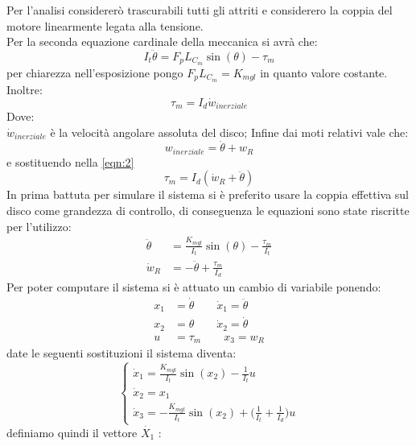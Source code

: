 \documentclass[12pt,a4paper,twoside, openright]{scrartcl}
\newcommand{\thetap}{\dot{\theta}}
\newcommand{\thetapp}{\ddot{\theta}}
\newcommand{\Xup}{\dot{X_1}}
\newcommand{\xu}{x_1}
\newcommand{\xd}{x_2}
\newcommand{\xt}{x_3}
\newcommand{\xup}{\dot{x}_1}
\newcommand{\xdp}{\dot{x}_2}
\newcommand{\xtp}{\dot{x}_3}
\begin{document}
	Per l'analisi considererò trascurabili tutti gli attriti e considerero la coppia del motore linearmente legata alla tensione.\\
	Per la seconda equazione cardinale della meccanica si avrà che:
	\begin{equation}
		\label{eqn:1}
		I_t\thetapp=F_p L_{C_m}\sin(\theta)- \tau_m
	\end{equation}
	per chiarezza nell'esposizione pongo $F_p L_{C_m}=K_{mgl}$ in quanto valore costante.
	Inoltre:
	\begin{equation}
		\label{eqn:2} 
	 	\tau_m =I_d \dot{w}_{inerziale}
	 \end{equation}
	Dove:\\
	 $\dot{w}_{inerziale}$ è la velocità angolare assoluta del disco;
	Infine dai moti relativi vale che:
	\begin{equation}
		\label{eqn:4}
		w_{inerziale}=\thetap+w_R 
	\end{equation}
	e sostituendo nella \ref{eqn:2}
	\begin{equation}
		\label{eqn:5}
		\tau_m =I_d (\dot{w}_{R}+\thetapp)
	\end {equation}
	In prima battuta per simulare il sistema si è preferito usare la coppia effettiva sul disco come grandezza di controllo, di conseguenza le equazioni sono state riscritte per l'utilizzo:
\begin{align}
	\thetapp&=\frac{K_{mgl}}{I_t}\sin(\theta) -\frac{\tau_m}{I_t} \label{eqn:6}\\
	\dot{w}_R&=-\thetapp + \frac{\tau_m}{I_d} \label{eqn:7}
\end{align}
	Per poter computare il sistema si è attuato un cambio di variabile ponendo:
\begin{align}
\xu&=\thetap\qquad	  \xup=\thetapp  \label{eqn:8}\\
\xd&=\theta 	\qquad	  \xdp=\thetap \label{eqn:9}\\
u&=\tau_m \qquad \xt=w_R \label{eqn:10}
\end{align}
	date le seguenti sostituzioni il sistema diventa:
\begin{equation}
	\label{sis:1}
	\begin{cases}
		\xup=\frac{K_{mgl}}{I_t}\sin(\xd) -\frac{1}{I_t}u   \\
		\xdp=\xu\\
		\xtp=-\frac{K_{mgl}}{I_t}\sin(\xd) +\big(\frac{1}{I_t}+\frac{1}{I_d}\big)u 
	\end{cases}
\end{equation}
	definiamo quindi il vettore $\Xup$ :
\end{document}
